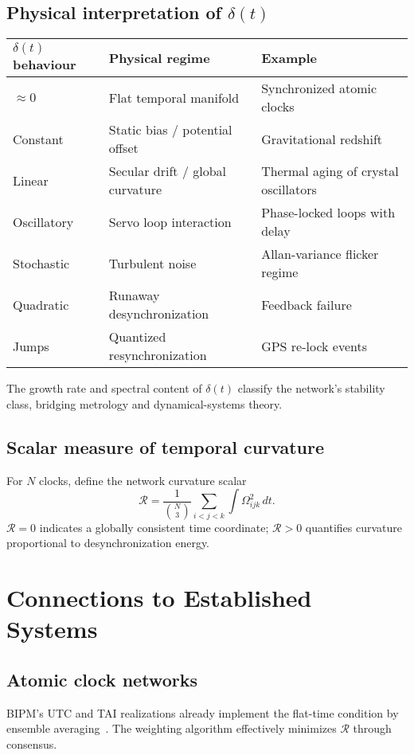 \documentclass[11pt,a4paper]{article}
\begin{document}
\subsection{Physical interpretation of $\delta(t)$}
\begin{center}
\begin{tabular}{lll}
\hline
$\delta(t)$ behaviour & Physical regime & Example \\ \hline
$\approx 0$ & Flat temporal manifold & Synchronized atomic clocks \\
Constant & Static bias / potential offset & Gravitational redshift \\
Linear & Secular drift / global curvature & Thermal aging of crystal oscillators \\
Oscillatory & Servo loop interaction & Phase-locked loops with delay \\
Stochastic & Turbulent noise & Allan-variance flicker regime \\
Quadratic & Runaway desynchronization & Feedback failure \\
Jumps & Quantized resynchronization & GPS re-lock events \\
\hline
\end{tabular}
\end{center}

The growth rate and spectral content of $\delta(t)$ classify the network's stability class, bridging metrology and dynamical-systems theory.

\subsection{Scalar measure of temporal curvature}
For $N$ clocks, define the network curvature scalar
\begin{equation}
\mathcal{R} = 
\frac{1}{\binom{N}{3}}
\sum_{i<j<k} 
\int \Omega_{ijk}^2 \, dt.
\end{equation}
$\mathcal{R}=0$ indicates a globally consistent time coordinate; $\mathcal{R}>0$ quantifies curvature proportional to desynchronization energy.

\section{Connections to Established Systems}

\subsection{Atomic clock networks}
BIPM's UTC and TAI realizations already implement the flat-time condition by ensemble averaging~\citep{Petit2014}. 
The weighting algorithm effectively minimizes $\mathcal{R}$ through consensus.
\end{document}
